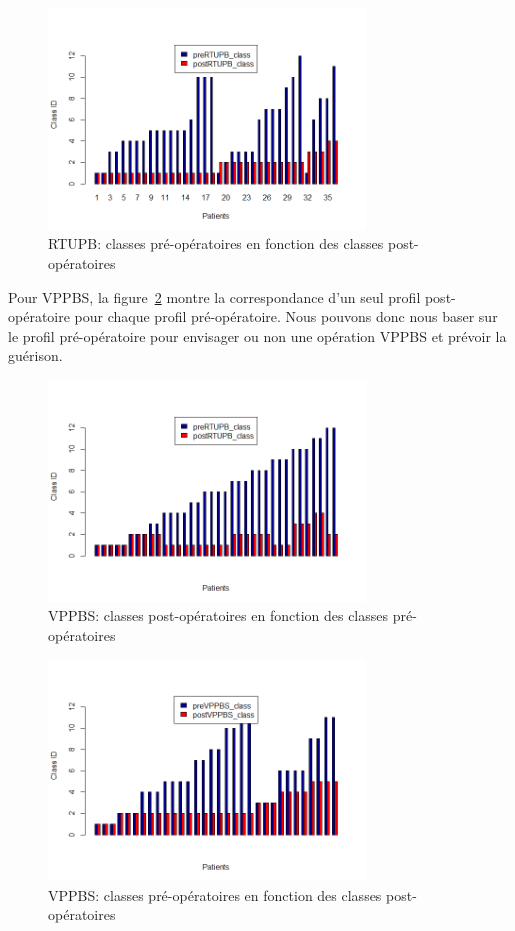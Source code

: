 \begin{figure}[H]
\centering
\includegraphics[width=0.75\textwidth]{../Fig/RTUPB/rtupb-histogram-post-pre.png}
\caption[]{RTUPB: classes pré-opératoires en fonction des classes post-opératoires}
\label{fig-rtupb-histogram2}
\end{figure}

Pour VPPBS, la figure~\ref{fig-vppbs-histogram} montre la correspondance d'un seul profil post-opératoire pour chaque profil pré-opératoire. Nous pouvons donc nous baser sur le profil pré-opératoire pour envisager ou non une opération VPPBS et prévoir la guérison.

\begin{figure}[H]
\centering
\includegraphics[width=0.75\textwidth]{../Fig/VPPBS/vppbs-histogram-pre-post.png}
\caption{VPPBS: classes post-opératoires en fonction des classes pré-opératoires}
\label{fig-vppbs-histogram}
\end{figure}

\begin{figure}[H]
\centering
\includegraphics[width=0.75\textwidth]{../Fig/VPPBS/vppbs-histogram-post-pre.png}
\caption[]{VPPBS: classes pré-opératoires en fonction des classes post-opératoires}
\label{fig-vppbs-histogram2}
\end{figure}
